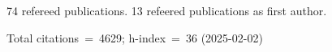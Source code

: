 74 refereed publications. 13 refeered publications as first author.

Total citations~=~4629; h-index~=~36 (2025-02-02)